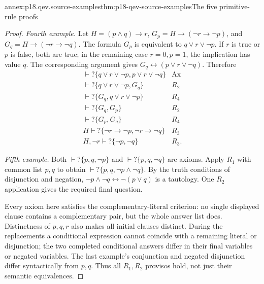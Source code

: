 \begin{annexitem}{annex:p18.qev.source-examples}{thm:p18-qev-source-examples}{The five primitive-rule proofs}
\begin{proof}
\emph{Fourth example.} Let
\(H=(p\land q)\to r\),
\(G_p=H\to(\neg r\to\neg p)\), and
\(G_q=H\to(\neg r\to\neg q)\).
The formula \(G_p\) is equivalent to \(q\lor r\lor\neg p\).
If \(r\) is true or \(p\) is false, both are true; in the
remaining case \(r=0,p=1\), the implication has value \(q\).
The corresponding argument gives
\(G_q\leftrightarrow(p\lor r\lor\neg q)\). Therefore
\[
\begin{array}{ll}
\vdash?\{q\lor r\lor\neg p,p\lor r\lor\neg q\}&\mathrm{Ax}\\
\vdash?\{q\lor r\lor\neg p,G_q\}&R_2\\
\vdash?\{G_q,q\lor r\lor\neg p\}&R_4\\
\vdash?\{G_q,G_p\}&R_2\\
\vdash?\{G_p,G_q\}&R_4\\
H\vdash?\{\neg r\to\neg p,\neg r\to\neg q\}&R_3\\
H,\neg r\vdash?\{\neg p,\neg q\}&R_3.
\end{array}
\]

\emph{Fifth example.} Both
\(\vdash?\{p,q,\neg p\}\) and
\(\vdash?\{p,q,\neg q\}\) are axioms. Apply \(R_1\)
with common list \(p,q\) to obtain
\(\vdash?\{p,q,\neg p\land\neg q\}\). By the truth
conditions of disjunction and negation,
\(\neg p\land\neg q\leftrightarrow\neg(p\lor q)\)
is a tautology. One \(R_2\) application gives the required final
question.

Every axiom here satisfies the complementary-literal criterion:
no single displayed clause contains a complementary pair, but the
whole answer list does. Distinctness of \(p,q,r\) also makes all
initial clauses distinct. During the replacements a conditional
expression cannot coincide with a remaining literal or disjunction;
the two completed conditional answers differ in their final variables
or negated variables. The last example's conjunction and negated
disjunction differ syntactically from \(p,q\). Thus all \(R_1,R_2\)
provisos hold, not just their semantic equivalences.
\end{proof}
\end{annexitem}

